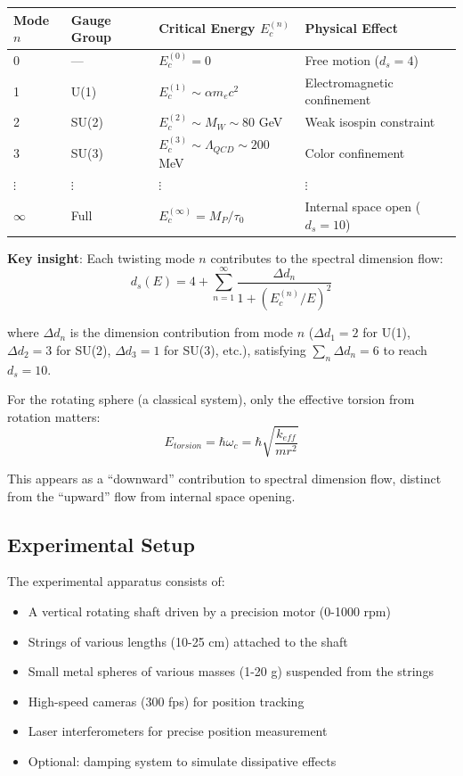 \documentclass[12pt,a4paper]{article}
\begin{document}
\begin{center}
\begin{tabular}{p{2cm}p{2.5cm}p{3.5cm}p{4cm}}
\toprule
\textbf{Mode $n$} & \textbf{Gauge Group} & \textbf{Critical Energy $E_c^{(n)}$} & \textbf{Physical Effect} \\
\midrule
0 & --- & $E_c^{(0)} = 0$ & Free motion ($d_s = 4$) \\
1 & U(1) & $E_c^{(1)} \sim \alpha m_e c^2$ & Electromagnetic confinement \\
2 & SU(2) & $E_c^{(2)} \sim M_W \sim 80$ GeV & Weak isospin constraint \\
3 & SU(3) & $E_c^{(3)} \sim \Lambda_{QCD} \sim 200$ MeV & Color confinement \\
$\vdots$ & $\vdots$ & $\vdots$ & $\vdots$ \\
$\infty$ & Full & $E_c^{(\infty)} = M_P/\tau_0$ & Internal space open ($d_s = 10$) \\
\bottomrule
\end{tabular}
\end{center}

\textbf{Key insight}: Each twisting mode $n$ contributes to the spectral dimension flow:
\begin{equation}
    d_s(E) = 4 + \sum_{n=1}^{\infty} \frac{\Delta d_n}{1+(E_c^{(n)}/E)^2}
\end{equation}

where $\Delta d_n$ is the dimension contribution from mode $n$ ($\Delta d_1 = 2$ for U(1), $\Delta d_2 = 3$ for SU(2), $\Delta d_3 = 1$ for SU(3), etc.), satisfying $\sum_n \Delta d_n = 6$ to reach $d_s = 10$.

For the rotating sphere (a classical system), only the effective torsion from rotation matters:
\begin{equation}
    E_{torsion} = \hbar\omega_c = \hbar\sqrt{\frac{k_{eff}}{mr^2}}
\end{equation}

This appears as a ``downward'' contribution to spectral dimension flow, distinct from the ``upward'' flow from internal space opening.
\label{sec:experiment}

\subsection{Experimental Setup}

The experimental apparatus consists of:
\begin{itemize}
    \item A vertical rotating shaft driven by a precision motor (0-1000 rpm)
    \item Strings of various lengths (10-25 cm) attached to the shaft
    \item Small metal spheres of various masses (1-20 g) suspended from the strings
    \item High-speed cameras (300 fps) for position tracking
    \item Laser interferometers for precise position measurement
    \item Optional: damping system to simulate dissipative effects
\end{itemize}
\end{document}
